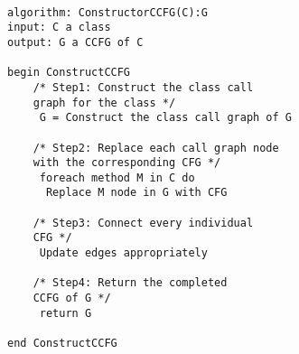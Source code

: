 \documentclass[letterpaper,twocolumn,10pt]{article}
\begin{document}
\paragraph{}
\lstset{basicstyle=\small\ttfamily, tabsize=2}
\begin{lstlisting}
algorithm: ConstructorCCFG(C):G
input: C a class
output: G a CCFG of C

begin ConstructCCFG
	/* Step1: Construct the class call 
	graph for the class */ 
	 G = Construct the class call graph of G
	  
	/* Step2: Replace each call graph node 
	with the corresponding CFG */
	 foreach method M in C do
	  Replace M node in G with CFG

	/* Step3: Connect every individual 
	CFG */
	 Update edges appropriately 

	/* Step4: Return the completed 
	CCFG of G */
	 return G

end ConstructCCFG

\end{lstlisting}


{\footnotesize 

}



\theendnotes


\end{document}
